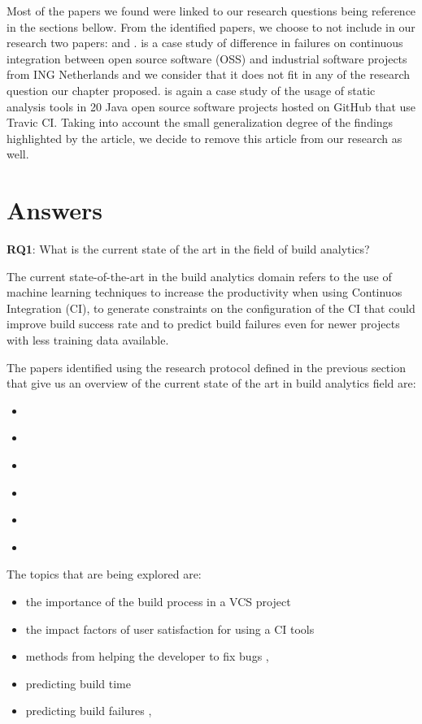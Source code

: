 \documentclass[]{book}
\providecommand{\tightlist}{%
  \setlength{\itemsep}{0pt}\setlength{\parskip}{0pt}}
\begin{document}
Most of the papers we found were linked to our research questions being
reference in the sections bellow. From the identified papers, we choose
to not include in our research two papers: \citet{vassallo2017tale} and
\citet{zampetti2017open}. \citet{vassallo2017tale} is a case study of
difference in failures on continuous integration between open source
software (OSS) and industrial software projects from ING Netherlands and
we consider that it does not fit in any of the research question our
chapter proposed. \citet{zampetti2017open} is again a case study of the
usage of static analysis tools in 20 Java open source software projects
hosted on GitHub that use Travic CI. Taking into account the small
generalization degree of the findings highlighted by the article, we
decide to remove this article from our research as well.

\section{Answers}\label{answers}

\textbf{RQ1}: What is the current state of the art in the field of build
analytics?

The current state-of-the-art in the build analytics domain refers to the
use of machine learning techniques to increase the productivity when
using Continuos Integration (CI), to generate constraints on the
configuration of the CI that could improve build success rate and to
predict build failures even for newer projects with less training data
available.

The papers identified using the research protocol defined in the
previous section that give us an overview of the current state of the
art in build analytics field are:

\begin{itemize}
\tightlist
\item
  \citet{hassan2018hirebuild}
\item
  \citet{vassallo2017tale}
\item
  \citet{baltes2018no}
\item
  \citet{bisong2017built}
\item
  \citet{santolucito2018statically}
\item
  \citet{ni2018acona}
\end{itemize}

The topics that are being explored are:

\begin{itemize}
\tightlist
\item
  the importance of the build process in a VCS project
  \citet{hassan2018hirebuild}
\item
  the impact factors of user satisfaction for using a CI tools
  \citet{widder2018m}
\item
  methods from helping the developer to fix bugs
  \citet{hassan2018hirebuild}, \citet{vassallo2018break}
\item
  predicting build time \citet{bisong2017built}
\item
  predicting build failures \citet{santolucito2018statically},
  \citet{ni2018acona}
\end{itemize}
\end{document}
